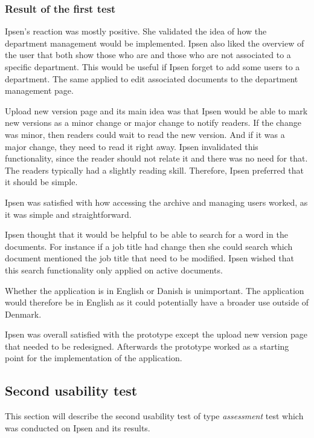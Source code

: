 \subsubsection*{Result of the first test}
Ipsen's reaction was mostly positive.
She validated the idea of how the department management would be implemented.
Ipsen also liked the overview of the user that both show those who are and those who are not associated to a specific department.
This would be useful if Ipsen forget to add some users to a department.
The same applied to edit associated documents to the department management page.

Upload new version page and its main idea was that Ipsen would be able to mark new versions as a minor change or major change to notify readers. %
If the change was minor, then readers could wait to read the new version.
And if it was a major change, they need to read it right away.
Ipsen invalidated this functionality, since the reader should not relate it and there was no need for that. %
The readers typically had a slightly reading skill. %
Therefore, Ipsen preferred that it should be simple.

Ipsen was satisfied with how accessing the archive and managing users worked, as it was simple and straightforward.

Ipsen thought that it would be helpful to be able to search for a word in the documents.
For instance if a job title had change then she could search which document mentioned the job title that need to be modified. %
Ipsen wished that this search functionality only applied on active documents.

Whether the application is in English or Danish is unimportant.
The application would therefore be in English as it could potentially have a broader use outside of Denmark.

Ipsen was overall satisfied with the prototype except the upload new version page that needed to be redesigned.
Afterwards the prototype worked as a starting point for the implementation of the application.

\subsection{Second usability test}\label{secondtest}
This section will describe the second usability test of type \textit{assessment} test which was conducted on Ipsen and its results.

